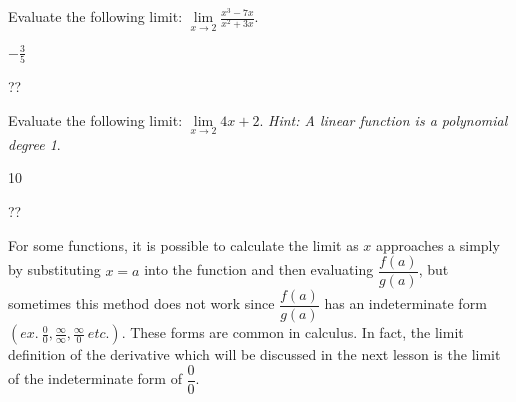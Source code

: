\begin{example}
Evaluate the following limit: \(\lim\limits_{x \to 2} \displaystyle \frac{x^3-7x}{x^2+3x}\).
    \begin{sol}
    $-\frac{3}{5}$
    \end{sol}
    \begin{solL}
    ??
    
    \end{solL}
    
\end{example}
\vspace{1.2 in}
\begin{comment}
\begin{example}
Evaluate the following limit: \(\lim\limits_{x \to 2} \displaystyle \frac{x^2-2x}{x^2-x-2}\).
    \begin{sol}
      $\frac{2}{3}$
    \end{sol}
    \begin{solL}
    ??
    
    \end{solL}
    
\end{example}
\vspace{0.6 in}
\end{comment}
\begin{example}
Evaluate the following limit: \(\lim\limits_{x \to 2} 4x+2\). \emph{Hint: A linear function is a polynomial degree 1}.
    \begin{sol}
      10
    \end{sol}
    \begin{solL}
    ??
    
    \end{solL}
    
\end{example}
\newpage
\noindent For some functions, it is possible to calculate the limit as $x$ approaches a simply by substituting $x = a$ into the function and then evaluating $\dfrac{f(a)}{g(a)}$, but sometimes this method does not work since $\dfrac{f(a)}{g(a)}$ has an indeterminate form \(\left(ex.\ \displaystyle\frac{0}{0}, \displaystyle\frac{\infty}{\infty}, \displaystyle\frac{\infty}{0} \ etc. \right)\). These forms are common in calculus. In fact, the limit definition of the derivative which will be discussed in the next lesson is the limit of the indeterminate form of $\dfrac{0}{0}$.\\

